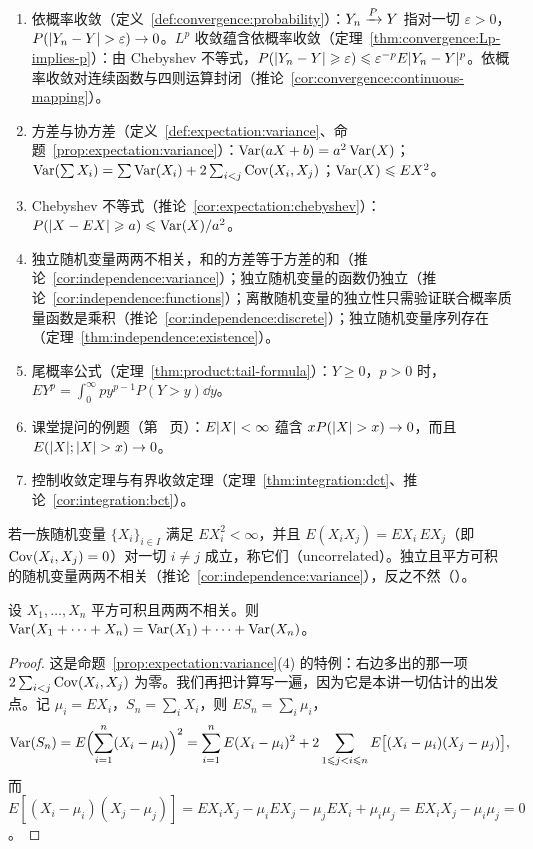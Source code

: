 \begin{enumerate}
\item 依概率收敛（定义~\ref{def:convergence:probability}）：$Y_n\xrightarrow{P} Y$ 指对一切 $\varepsilon>0$，$P(\lvert Y_n-Y\rvert>\varepsilon)\to0$。$L^p$ 收敛蕴含依概率收敛（定理~\ref{thm:convergence:Lp-implies-p}）：由 Chebyshev 不等式，$P(\lvert Y_n-Y\rvert\geqslant\varepsilon)\leqslant\varepsilon^{-p}E\lvert Y_n-Y\rvert^p$。依概率收敛对连续函数与四则运算封闭（推论~\ref{cor:convergence:continuous-mapping}）。
\item 方差与协方差（定义~\ref{def:expectation:variance}、命题~\ref{prop:expectation:variance}）：$\operatorname{Var}(aX+b)=a^2\operatorname{Var}(X)$；$\operatorname{Var}(\sum X_i)=\sum\operatorname{Var}(X_i)+2\sum_{i<j}\operatorname{Cov}(X_i,X_j)$；$\operatorname{Var}(X)\leqslant EX^2$。
\item Chebyshev 不等式（推论~\ref{cor:expectation:chebyshev}）：$P(\lvert X-EX\rvert\geqslant a)\leqslant\operatorname{Var}(X)/a^2$。
\item 独立随机变量两两不相关，和的方差等于方差的和（推论~\ref{cor:independence:variance}）；独立随机变量的函数仍独立（推论~\ref{cor:independence:functions}）；离散随机变量的独立性只需验证联合概率质量函数是乘积（推论~\ref{cor:independence:discrete}）；独立随机变量序列存在（定理~\ref{thm:independence:existence}）。
\item 尾概率公式（定理~\ref{thm:product:tail-formula}）：$Y\geqslant0$，$p>0$ 时，$EY^p=\int_0^\infty py^{p-1}P(Y>y)\dd y$。
\item 课堂提问的例题（第~\pageref{we:expectation:tP} 页）：$E\lvert X\rvert<\infty$ 蕴含 $xP(\lvert X\rvert>x)\to0$，而且 $E(\lvert X\rvert;\lvert X\rvert>x)\to0$。
\item 控制收敛定理与有界收敛定理（定理~\ref{thm:integration:dct}、推论~\ref{cor:integration:bct}）。
\end{enumerate}


若一族随机变量 $\{X_i\}_{i\in I}$ 满足 $EX_i^2<\infty$，并且 $E(X_iX_j)=EX_i\,EX_j$（即 $\operatorname{Cov}(X_i,X_j)=0$）对一切 $i\neq j$ 成立，称它们（uncorrelated）。独立且平方可积的随机变量两两不相关（推论~\ref{cor:independence:variance}），反之不然（）。

\begin{theorem}\label{thm:weak-laws:variance-sum}
设 $X_1,\dots,X_n$ 平方可积且两两不相关。则 $\operatorname{Var}(X_1+\cdots+X_n)=\operatorname{Var}(X_1)+\cdots+\operatorname{Var}(X_n)$。
\end{theorem}
\begin{proof}
这是命题~\ref{prop:expectation:variance}(4) 的特例：右边多出的那一项 $2\sum_{i<j}\operatorname{Cov}(X_i,X_j)$ 为零。我们再把计算写一遍，因为它是本讲一切估计的出发点。记 $\mu_i=EX_i$，$S_n=\sum_iX_i$，则 $ES_n=\sum_i\mu_i$，
\[
\operatorname{Var}(S_n)=E\Bigl(\sum_{i=1}^n(X_i-\mu_i)\Bigr)^2=\sum_{i=1}^nE(X_i-\mu_i)^2+2\sum_{1\leqslant j<i\leqslant n}E\bigl[(X_i-\mu_i)(X_j-\mu_j)\bigr],
\]
而 $E[(X_i-\mu_i)(X_j-\mu_j)]=EX_iX_j-\mu_iEX_j-\mu_jEX_i+\mu_i\mu_j=EX_iX_j-\mu_i\mu_j=0$。
\end{proof}

